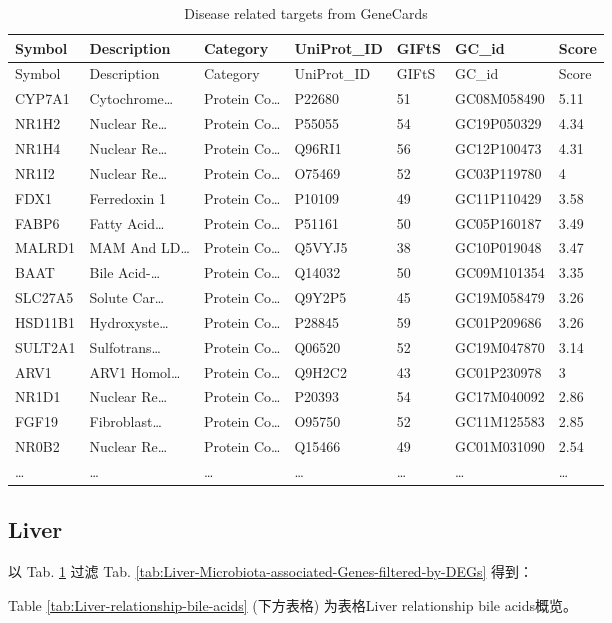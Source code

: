 \documentclass[
]{article}
\begin{document}
\begin{longtable}[]{@{}lllllll@{}}
\caption{\label{tab:Disease-related-targets-from-GeneCards}Disease related targets from GeneCards}\tabularnewline
\toprule
Symbol & Description & Category & UniProt\_ID & GIFtS & GC\_id & Score\tabularnewline
\midrule
\endfirsthead
\toprule
Symbol & Description & Category & UniProt\_ID & GIFtS & GC\_id & Score\tabularnewline
\midrule
\endhead
CYP7A1 & Cytochrome\ldots{} & Protein Co\ldots{} & P22680 & 51 & GC08M058490 & 5.11\tabularnewline
NR1H2 & Nuclear Re\ldots{} & Protein Co\ldots{} & P55055 & 54 & GC19P050329 & 4.34\tabularnewline
NR1H4 & Nuclear Re\ldots{} & Protein Co\ldots{} & Q96RI1 & 56 & GC12P100473 & 4.31\tabularnewline
NR1I2 & Nuclear Re\ldots{} & Protein Co\ldots{} & O75469 & 52 & GC03P119780 & 4\tabularnewline
FDX1 & Ferredoxin 1 & Protein Co\ldots{} & P10109 & 49 & GC11P110429 & 3.58\tabularnewline
FABP6 & Fatty Acid\ldots{} & Protein Co\ldots{} & P51161 & 50 & GC05P160187 & 3.49\tabularnewline
MALRD1 & MAM And LD\ldots{} & Protein Co\ldots{} & Q5VYJ5 & 38 & GC10P019048 & 3.47\tabularnewline
BAAT & Bile Acid-\ldots{} & Protein Co\ldots{} & Q14032 & 50 & GC09M101354 & 3.35\tabularnewline
SLC27A5 & Solute Car\ldots{} & Protein Co\ldots{} & Q9Y2P5 & 45 & GC19M058479 & 3.26\tabularnewline
HSD11B1 & Hydroxyste\ldots{} & Protein Co\ldots{} & P28845 & 59 & GC01P209686 & 3.26\tabularnewline
SULT2A1 & Sulfotrans\ldots{} & Protein Co\ldots{} & Q06520 & 52 & GC19M047870 & 3.14\tabularnewline
ARV1 & ARV1 Homol\ldots{} & Protein Co\ldots{} & Q9H2C2 & 43 & GC01P230978 & 3\tabularnewline
NR1D1 & Nuclear Re\ldots{} & Protein Co\ldots{} & P20393 & 54 & GC17M040092 & 2.86\tabularnewline
FGF19 & Fibroblast\ldots{} & Protein Co\ldots{} & O95750 & 52 & GC11M125583 & 2.85\tabularnewline
NR0B2 & Nuclear Re\ldots{} & Protein Co\ldots{} & Q15466 & 49 & GC01M031090 & 2.54\tabularnewline
\ldots{} & \ldots{} & \ldots{} & \ldots{} & \ldots{} & \ldots{} & \ldots{}\tabularnewline
\bottomrule
\end{longtable}

\hypertarget{liver2}{%
\subsection{Liver}\label{liver2}}

以 Tab. \ref{tab:Disease-related-targets-from-GeneCards} 过滤
Tab. \ref{tab:Liver-Microbiota-associated-Genes-filtered-by-DEGs}
得到：

Table \ref{tab:Liver-relationship-bile-acids} (下方表格) 为表格Liver relationship bile acids概览。
\end{document}
